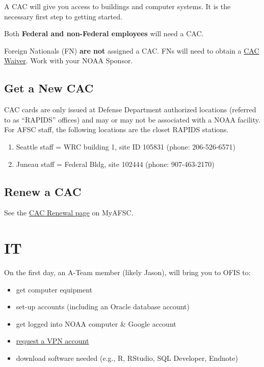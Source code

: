 \documentclass[
  letterpaper,
  DIV=11,
  numbers=noendperiod]{scrreprt}
\providecommand{\tightlist}{%
  \setlength{\itemsep}{0pt}\setlength{\parskip}{0pt}}\usepackage{longtable,booktabs,array}
\begin{document}
A CAC will give you access to buildings and computer systems. It is the
necessary first step to getting started.

Both \textbf{Federal and non-Federal employees} will need a CAC.

Foreign Nationals (FN) \textbf{are not} assigned a CAC. FNs will need to
obtain a
\href{https://sites.google.com/noaa.gov/myafsc/technology/it-security/cac-waivers}{CAC
Waiver}. Work with your NOAA Sponsor.

\subsection{Get a New CAC}\label{get-a-new-cac}

CAC cards are only issued at Defense Department authorized locations
(referred to as ``RAPIDS'' offices) and may or may not be associated
with a NOAA facility. For AFSC staff, the following locations are the
closet RAPIDS stations.

\begin{enumerate}
\def\labelenumi{\arabic{enumi}.}
\item
  Seattle staff = WRC building 1, site ID 105831 (phone: 206-526-6571)
\item
  Juneau staff = Federal Bldg, site 102444 (phone: 907-463-2170)
\end{enumerate}

\subsection{Renew a CAC}\label{renew-a-cac}

See the
\href{https://sites.google.com/noaa.gov/myafsc/administrative/security/cac-renewal}{CAC
Renewal page} on MyAFSC.

\section{IT}\label{it}

On the first day, an A-Team member (likely Jason), will bring you to
OFIS to:

\begin{itemize}
\tightlist
\item
  get computer equipment
\item
  set-up accounts (including an Oracle database account)
\item
  get logged into NOAA computer \& Google account
\item
  \href{https://www.google.com/url?q=https\%3A\%2F\%2Fsites.google.com\%2Fnoaa.gov\%2Fmyafsc\%2Ftechnology\%2Fvpn-virtual-private-network&sa=D&sntz=1&usg=AOvVaw1YGm7HPymJCqrAYQakwJVj}{request
  a VPN account}
\item
  download software needed (e.g., R, RStudio, SQL Developer, Endnote)
\end{itemize}
\end{document}
